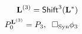 \documentclass[preview]{standalone}
\begin{document}
\begin{align*}
\special{dvisvgm:raw <g id='unique000'>}\mathbf{L}^{(3)} = \mathsf{Shift}^3(\mathbf{L}^*)\\P_0^{\mathbf{L}^{(3)}} = P_3,\;\; \Box_{\text{Syn}}\phi_3\special{dvisvgm:raw </g>}
\end{align*}
\end{document}

